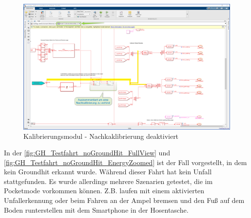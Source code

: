 \begin{figure}[H]
	\centering
	\includegraphics[width=\linewidth]{Bilder/KalibModul_Nachkaklib_deaktiviert.png}
	\caption{Kalibrierungsmodul - Nachkaklibrierung deaktiviert}
	\label{fig:KalibModul_Nachkaklib_deaktiviert}
\end{figure}
In der \autoref{fig:GH_Testfahrt_noGroundHit_FullView} und \autoref{fig:GH_Testfahrt_noGroundHit_EnergyZoomed} ist der Fall vorgestellt, in dem kein Groundhit erkannt wurde. Während dieser Fahrt hat kein Unfall stattgefunden. Es wurde allerdings mehrere Szenarien getestet, die im Pocketmode vorkommen können. Z.B. laufen mit einem aktivierten Unfallerkennung oder beim Fahren an der Ampel bremsen und den Fuß auf dem Boden runterstellen mit dem Smartphone in der Hosentasche.

